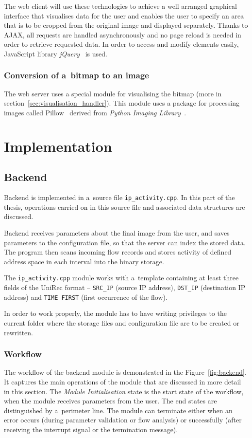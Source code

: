 The web client will use these technologies to achieve a well arranged graphical interface that
visualises data for the user and enables the user to specify an area that
is to be cropped from the original image and displayed separately.
Thanks to AJAX, all requests are handled asynchronously and no page reload
is needed in order to retrieve requested data.
In order to access and modify elements easily, JavaScript library \textit{jQuery}~\cite{jquery} is used.


\subsection{Conversion of a~bitmap to an image}
The web server uses a special module for visualising the bitmap (more in
section~\ref{sec:visualisation_handler}). This module uses a package for
processing images called Pillow~\cite{pillow} derived from \textit{Python Imaging Library}~\cite{pil}.

\csdoublequotesoff

\chapter{Implementation}\label{sec:chapter4}

\section{Backend}
Backend is implemented in a~source file \texttt{ip\_activity.cpp}. In this part of the thesis,
operations carried on in this source file and associated data structures are discussed.

Backend receives parameters about the final image from the user,
and saves parameters to the configuration file, so that the server can index the stored data.
The program then scans incoming flow records and stores activity of defined address space in
each interval into the binary storage.

The \texttt{ip\_activity.cpp} module works with a~template containing at least three fields of
the UniRec format -- \texttt{SRC\_IP} (source IP address), \texttt{DST\_IP} (destination IP address)
and \texttt{TIME\_FIRST} (first occurrence of the flow).

In order to work properly, the module has to have writing privileges to the current folder where
the storage files and configuration file are to be created or rewritten.

\subsection{Workflow}
The workflow of the backend module is demonstrated in the Figure~\ref{fig:backend}.
It captures the main operations of the module that are discussed in more detail
in this section. The \textit{Module Initialisation} state is the start state of the workflow,
when the module receives parameters from the user. The end states are distinguished by a~perimeter
line. The module can terminate either when an error occurs (during parameter validation or
flow analysis) or successfully (after receiving the interrupt signal or the termination message).


